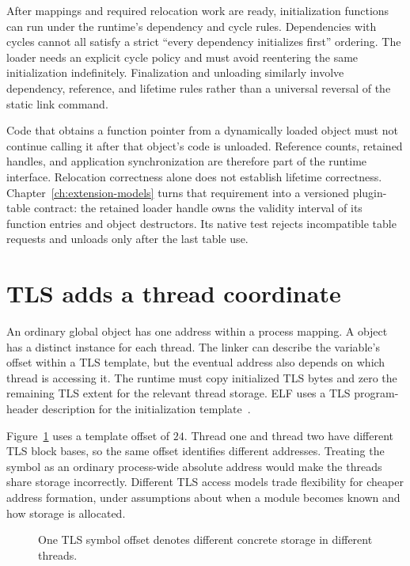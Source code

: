 After mappings and required relocation work are ready, initialization functions can run under the runtime's dependency and cycle rules.
Dependencies with cycles cannot all satisfy a strict \enquote{every dependency initializes first} ordering.
The loader needs an explicit cycle policy and must avoid reentering the same initialization indefinitely.
Finalization and unloading similarly involve dependency, reference, and lifetime rules rather than a universal reversal of the static link command.

Code that obtains a function pointer from a dynamically loaded object must not continue calling it after that object's code is unloaded.
Reference counts, retained handles, and application synchronization are therefore part of the runtime interface.
Relocation correctness alone does not establish lifetime correctness.
Chapter~\ref{ch:extension-models} turns that requirement into a versioned plugin-table contract: the retained loader handle owns the validity interval of its function entries and object destructors.
Its native test rejects incompatible table requests and unloads only after the last table use.

\section{TLS adds a thread coordinate}
\label{sec:ch59-tls}

An ordinary global object has one address within a process mapping.
A  object has a distinct instance for each thread.
The linker can describe the variable's offset within a TLS template, but the eventual address also depends on which thread is accessing it.
The runtime must copy initialized TLS bytes and zero the remaining TLS extent for the relevant thread storage.
ELF uses a TLS program-header description for the initialization template~\cite{xinuos-2026-elf}.

Figure~\ref{fig:ch59-tls} uses a template offset of $24$.
Thread one and thread two have different TLS block bases, so the same offset identifies different addresses.
Treating the symbol as an ordinary process-wide absolute address would make the threads share storage incorrectly.
Different TLS access models trade flexibility for cheaper address formation, under assumptions about when a module becomes known and how storage is allocated.

\begin{figure}[htbp]
\centering
{}
\caption{One TLS symbol offset denotes different concrete storage in different threads.}
\label{fig:ch59-tls}
\end{figure}

